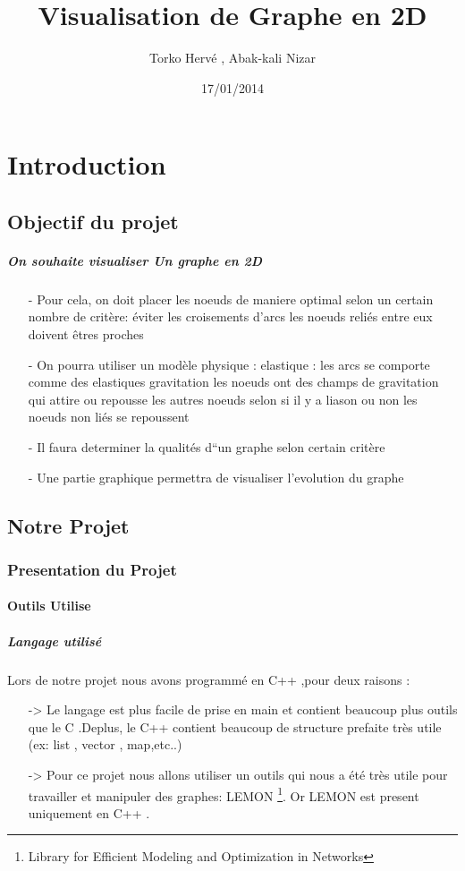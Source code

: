 \documentclass[a4paper,10pt]{report}
\title{Visualisation de Graphe en 2D}
\author{Torko Hervé , Abak-kali Nizar}
\date{17/01/2014}
\begin{document}
\maketitle
\tableofcontents
\chapter{Introduction}
  \section{Objectif du projet}
    \paragraph{On souhaite visualiser Un graphe en 2D}
     
      \begin{itemize}
	\item[-]Pour cela, on doit placer les noeuds de maniere optimal selon un certain nombre de critère:
	  \subitem[-] éviter les croisements d'arcs
 	  \subitem[-] les noeuds reliés entre eux doivent êtres proches 
	\item[-] On pourra utiliser un modèle physique : 
	   \subitem[-] elastique : les arcs se comporte comme des elastiques
	    \subitem[-] gravitation les noeuds ont des champs de gravitation qui attire ou repousse les autres noeuds selon si il y a liason ou non 
	    \subitem[-] les noeuds non liés se repoussent 
	 \item[-] Il faura determiner la qualités d``un graphe selon certain critère
	 \item[-] Une partie graphique permettra de visualiser l'evolution du graphe 
      \end{itemize}
  \section{Notre Projet}
    \subsection{Presentation du Projet}	
      \subsubsection{Outils Utilise}
	 \paragraph{Langage utilisé}
	  Lors de notre projet nous avons programmé en C++ ,pour deux raisons :
	    \begin{itemize}
	      \item[->] Le langage est plus facile de prise en main et contient beaucoup plus outils que le C .Deplus,
	      le C++ contient beaucoup de structure prefaite très utile (ex: list , vector , map,etc..)
	      \item[->] Pour ce projet nous allons utiliser un outils qui nous a été très utile pour travailler et 
	      manipuler des graphes: LEMON \footnote[1]{Library for Efficient Modeling and Optimization in Networks}.
	      Or LEMON est present uniquement en C++ .
	    \end{itemize}
\end{document}

